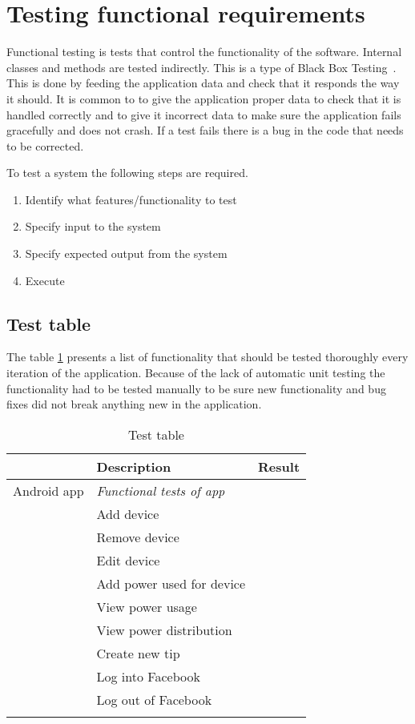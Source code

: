\section{Testing functional requirements}
\label{sec:funcTest}
Functional testing is tests that control the functionality of the software. Internal classes and methods are tested indirectly. This is a type of Black Box Testing~\cite{blackbox}. This is done by feeding the application data and check that it responds the way it should. It is common to to give the application proper data to check that it is handled correctly and to give it incorrect data to make sure the application fails gracefully and does not crash. If a test fails there is a bug in the code that needs to be corrected.

To test a system the following steps are required.
\begin{enumerate}
\item Identify what features/functionality to test
\item Specify input to the system
\item Specify expected output from the system
\item Execute
\end{enumerate}

\subsection{Test table}
The table \ref{tab:testTable} presents a list of functionality that should be tested thoroughly every iteration of the application. Because of the lack of automatic unit testing the functionality had to be tested manually to be sure new functionality and bug fixes did not break anything new in the application.

\begin{table}[H]
\begin{tabular}{|l|l|l|}
\hline
\rowcolor{darkgray} & \textbf{Description} & \textbf{Result}\\\hline \arrayrulecolor{lightgray}
\rowcolors{0}{darkgray}{lightgray}
Android app & \textit{Functional tests of app} &  \\ \cline{1-2}\cline{2-3}
&Add device&\\ \cline{1-2}\cline{2-3}
&Remove device&\\ \cline{1-2}\cline{2-3}
&Edit device&\\ \cline{1-2}\cline{2-3}
&Add power used for device&\\ \cline{1-2}\cline{2-3}
&View power usage&\\ \cline{1-2}\cline{2-3}
&View power distribution&\\ \cline{1-2}\cline{2-3}
&Create new tip&\\ \cline{1-2}\cline{2-3}
&Log into Facebook&\\ \cline{1-2}\cline{2-3}
&Log out of Facebook&\\\arrayrulecolor{black}
\hline
\end{tabular}
\caption{Test table}
\label{tab:testTable}
\end{table}

